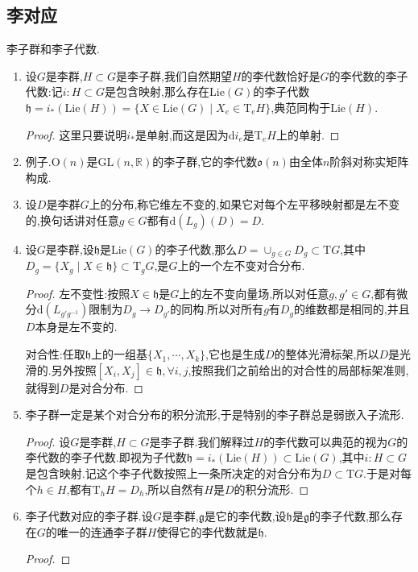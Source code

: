 \subsection{李对应}

李子群和李子代数.
\begin{enumerate}
	\item 设$G$是李群,$H\subset G$是李子群,我们自然期望$H$的李代数恰好是$G$的李代数的李子代数:记$i:H\subset G$是包含映射,那么存在$\mathrm{Lie}(G)$的李子代数$\mathfrak{h}=i_*(\mathrm{Lie}(H))=\{X\in\mathrm{Lie}(G)\mid X_e\in\mathrm{T}_eH\}$,典范同构于$\mathrm{Lie}(H)$.
	\begin{proof}
		
		这里只要说明$i_*$是单射,而这是因为$\mathrm{d}i_e$是$\mathrm{T}_eH$上的单射.
	\end{proof}
	\item 例子.$\mathrm{O}(n)$是$\mathrm{GL}(n,\mathbb{R})$的李子群,它的李代数$\mathfrak{o}(n)$由全体$n$阶斜对称实矩阵构成.
	\item 设$D$是李群$G$上的分布,称它维左不变的,如果它对每个左平移映射都是左不变的,换句话讲对任意$g\in G$都有$\mathrm{d}(L_g)(D)=D$.
	\item 设$G$是李群,设$\mathfrak{h}$是$\mathrm{Lie}(G)$的李子代数,那么$D=\cup_{g\in G}D_g\subset\mathrm{T}G$,其中$D_g=\{X_g\mid X\in\mathfrak{h}\}\subset\mathrm{T}_gG$,是$G$上的一个左不变对合分布.
	\begin{proof}
		
		左不变性:按照$X\in\mathfrak{h}$是$G$上的左不变向量场,所以对任意$g,g'\in G$,都有微分$\mathrm{d}(L_{g'g^{-1}})$限制为$D_g\to D_{g'}$的同构.所以对所有$g$有$D_g$的维数都是相同的,并且$D$本身是左不变的.
		
		对合性:任取$\mathfrak{h}$上的一组基$\{X_1,\cdots,X_k\}$,它也是生成$D$的整体光滑标架,所以$D$是光滑的.另外按照$[X_i,X_j]\in\mathfrak{h},\forall i,j$,按照我们之前给出的对合性的局部标架准则,就得到$D$是对合分布.
	\end{proof}
	\item 李子群一定是某个对合分布的积分流形,于是特别的李子群总是弱嵌入子流形.
	\begin{proof}
		
		设$G$是李群,$H\subset G$是李子群.我们解释过$H$的李代数可以典范的视为$G$的李代数的李子代数.即视为子代数$\mathfrak{h}=i_*(\mathrm{Lie}(H))\subset\mathrm{Lie}(G)$,其中$i:H\subset G$是包含映射.记这个李子代数按照上一条所决定的对合分布为$D\subset\mathrm{T}G$.于是对每个$h\in H$,都有$\mathrm{T}_hH=D_h$,所以自然有$H$是$D$的积分流形.
	\end{proof}
	\item 李子代数对应的李子群.设$G$是李群,$\mathfrak{g}$是它的李代数,设$\mathfrak{h}$是$\mathfrak{g}$的李子代数,那么存在$G$的唯一的连通李子群$H$使得它的李代数就是$\mathfrak{h}$.
	\begin{proof}
		

\end{proof}
\end{enumerate}
